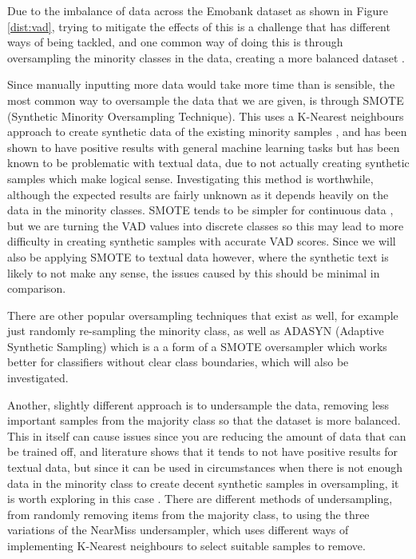 Due to the imbalance of data across the Emobank dataset as shown in Figure \ref{dist:vad}, trying to mitigate the effects of this is a challenge that has different ways of being tackled, and one common way of doing this is through oversampling the minority classes in the data, creating a more balanced dataset \cite{towardsDS}.

Since manually inputting more data would take more time than is sensible, the most common way to oversample the data that we are given, is through SMOTE (Synthetic Minority Oversampling Technique). This uses a K-Nearest neighbours approach to create synthetic data of the existing minority samples , and has been shown to have positive results with general machine learning tasks but has been known to be problematic with textual data, due to not actually creating synthetic samples which make logical sense. Investigating this method is worthwhile, although the expected results are fairly unknown as it depends heavily on the data in the minority classes. SMOTE tends to be simpler for continuous data \cite{chawla2002smote}, but we are turning the VAD values into discrete classes so this may lead to more difficulty in creating synthetic samples with accurate VAD scores. Since we will also be applying SMOTE to textual data however, where the synthetic text is likely to not make any sense, the issues caused by this should be minimal in comparison. 

There are other popular oversampling techniques that exist as well, for example just randomly re-sampling the minority class, as well as ADASYN (Adaptive Synthetic Sampling) which is a a form of a SMOTE oversampler which works better for classifiers without clear class boundaries, which will also be investigated.

Another, slightly different approach is to undersample the data, removing less important samples from the majority class so that the dataset is more balanced. This in itself can cause issues since you are reducing the amount of data that can be trained off, and literature shows that it tends to not have positive results for textual data, but since it can be used in circumstances when there is not enough data in the minority class to create decent synthetic samples in oversampling, it is worth exploring in this case \cite{more2016survey}. There are different methods of undersampling, from randomly removing items from the majority class, to using the three variations of the NearMiss undersampler, which uses different ways of implementing K-Nearest neighbours to select suitable samples to remove. 

